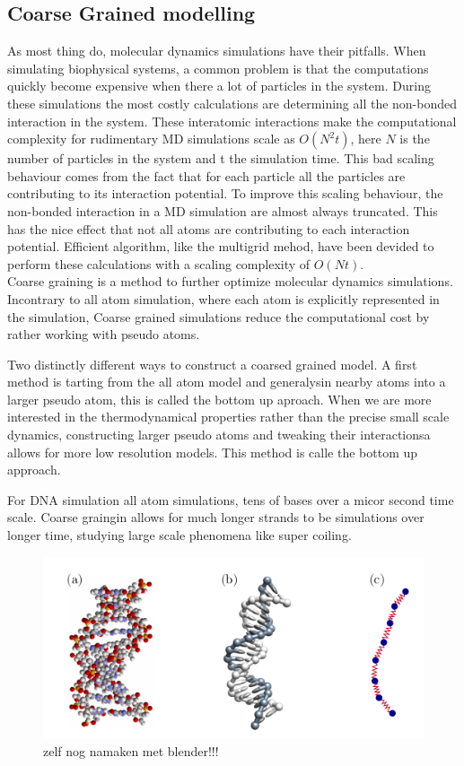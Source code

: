 \subsection{Coarse Grained modelling}
As most thing do, molecular dynamics simulations have their pitfalls. When simulating
biophysical systems, a common problem is that the computations quickly become expensive
when there a lot of particles in the system.
During these simulations the most costly calculations are determining all the non-bonded
interaction in the system. These interatomic interactions make the computational
complexity for rudimentary MD simulations scale as $O(N^2t)$, here $N$ is the number of
particles in the system and t the simulation time. This bad scaling behaviour comes from
the fact that for each particle all the particles are contributing to its interaction
potential. To improve this scaling behaviour, the non-bonded interaction in a MD
simulation are almost always truncated. This has the nice effect that not all atoms are
contributing to each interaction potential. Efficient algorithm, like the multigrid
mehod, have been devided to perform these calculations with a scaling complexity of
$O(Nt)$.\\

Coarse graining is a method to further optimize molecular dynamics simulations.
Incontrary to all atom simulation, where each atom is explicitly  represented in the
simulation, Coarse grained simulations reduce the computational cost by rather working
with pseudo atoms.

Two distinctly different ways to construct a coarsed grained model. A first method is
tarting from the all atom model and generalysin nearby atoms into a larger pseudo atom,
this is called the bottom up aproach. When we are more interested in the thermodynamical
properties rather than the precise small scale dynamics, constructing larger pseudo atoms
and tweaking their interactionsa allows for more low resolution models. This method is
calle the bottom up approach.

For DNA simulation all atom simulations, tens of bases over a micor second time scale.
Coarse graingin allows for much longer strands to be  simulations over longer time,
studying large scale phenomena like super coiling.





\begin{figure}[htpb]
    \centering
    \includegraphics[width=0.8\linewidth]{Figures/CoarseGrained.png}
    \caption{zelf nog namaken met blender!!!}%
    \label{fig:Figures/CoarseGrained}
\end{figure}
